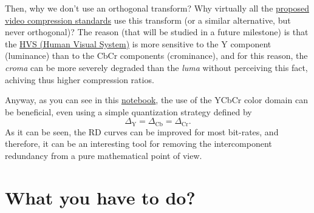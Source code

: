\begin{comment}
The International Consultative Committee for Radio (CCIR)11 Recommendation 601:
\begin{equation}
\begin{array}
Y ′= 219(+0.299R′ + 0.587G′ + 0.114B′) + 16 \\
CB′= 224(-0.169R′ - 0.331G′ + 0.500B′) + 128 \\
CR′= 224(+0.500R′ - 0.419G′ - 0.081B′) + 128
\end{array}
\end{equation}

0.299*(−0.169) + 0.587*(−0.331) + 0.114*0.500 = -.187828

(-0.169)*0.500 + (-0.331)*(-0.419) + 0.500*(-0.081) = .013689
\end{comment}

Then, why we don't use an orthogonal transform? Why virtually all the
\href{https://en.wikipedia.org/wiki/Video_coding_format}{proposed
  video compression standards} use this transform (or a similar
alternative, but never orthogonal)? The reason (that will be studied
in a future milestone) is that the
\href{https://en.wikipedia.org/wiki/Visual_system}{HVS (Human Visual
  System)} is more sensitive to the Y component (luminance) than to
the CbCr components (crominance), and for this reason, the
\emph{croma} can be more severely degraded than the \emph{luma}
without perceiving this fact, achiving thus higher compression ratios.

Anyway, as you can see in this
\href{https://github.com/Sistemas-Multimedia/Sistemas-Multimedia.github.io/blob/master/study_guide/06-color_transform/performance.ipynb}{notebook},
the use of the YCbCr color domain can be beneficial, even using a
simple quantization strategy defined by
\begin{equation}
  \Delta_{\text{Y}} = \Delta_{\text{Cb}} = \Delta_{\text{Cr}}.
\end{equation}
As it can be seen, the RD curves can be improved for most bit-rates,
and therefore, it can be an interesting tool for removing the
intercomponent redundancy from a pure mathematical point of view.

\section{What you have to do?}

